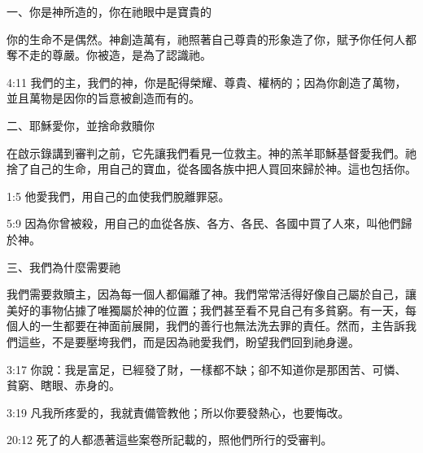 \clearpage
{}
\begin{center}
\begin{tcolorbox}[
    width=0.95\textwidth,
    colback=GospelCream,
    colframe=GospelMaroon,
    colbacktitle=GospelMaroon,
    coltitle=white,
    title={\small{\centering 你知道啟示錄中，有許多神要告訴你的福音嗎？}},
    fontupper=\small\setstretch{1.0},
    enhanced,
    boxrule=0.8pt,
    arc=2mm,
    breakable,
    left=3pt,
    right=3pt,
    top=6pt,
    bottom=6pt
]

一、你是神所造的，你在祂眼中是寶貴的

你的生命不是偶然。神創造萬有，祂照著自己尊貴的形象造了你，賦予你任何人都奪不走的尊嚴。你被造，是為了認識祂。
\begin{ScriptureBox}
\item[4:11] 我們的主，我們的神，你是配得榮耀、尊貴、權柄的；因為你創造了萬物，並且萬物是因你的旨意被創造而有的。
\end{ScriptureBox}

\vspace{0.3cm}
二、耶穌愛你，並捨命救贖你

在啟示錄講到審判之前，它先讓我們看見一位救主。神的羔羊耶穌基督愛我們。祂捨了自己的生命，用自己的寶血，從各國各族中把人買回來歸於神。這也包括你。
\begin{ScriptureBox}
\item[1:5] 他愛我們，用自己的血使我們脫離罪惡。
\item[5:9] 因為你曾被殺，用自己的血從各族、各方、各民、各國中買了人來，叫他們歸於神。
\end{ScriptureBox}

\vspace{0.3cm}
三、我們為什麼需要祂

我們需要救贖主，因為每一個人都偏離了神。我們常常活得好像自己屬於自己，讓美好的事物佔據了唯獨屬於神的位置；我們甚至看不見自己有多貧窮。有一天，每個人的一生都要在神面前展開，我們的善行也無法洗去罪的責任。然而，主告訴我們這些，不是要壓垮我們，而是因為祂愛我們，盼望我們回到祂身邊。
\begin{ScriptureBox}
\item[3:17] 你說：我是富足，已經發了財，一樣都不缺；卻不知道你是那困苦、可憐、貧窮、瞎眼、赤身的。
\item[3:19] 凡我所疼愛的，我就責備管教他；所以你要發熱心，也要悔改。
\item[20:12] 死了的人都憑著這些案卷所記載的，照他們所行的受審判。
\end{ScriptureBox}


\end{tcolorbox}
\end{center}
